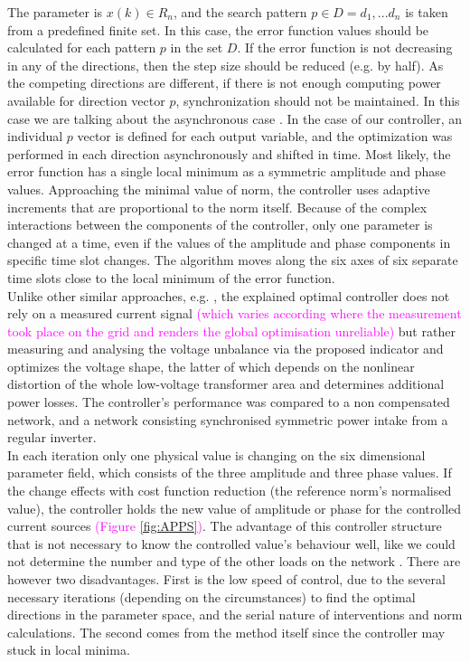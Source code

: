         The parameter is  $x(k)\in R_n$, and the search pattern $p\in D={d_1,...d_n}$ is taken from a predefined finite set. In this case, the error function values should be calculated for each pattern $p$ in the set $D$. If the error function is not decreasing in any of the directions, then the step size should be reduced (e.g. by half). As the competing directions are different, if there is not enough computing power available for direction vector $p$, synchronization should not be maintained. In this case we are talking about the asynchronous case . In the case of our controller, an individual $p$ vector is defined for each output variable, and the optimization was performed in each direction asynchronously and shifted in time. Most likely, the error function has a single local minimum as a symmetric amplitude and phase values. Approaching the minimal value of norm, the controller uses adaptive increments that are proportional to the norm itself. Because of the complex interactions between the components of the controller, only one parameter is changed at a time, even if the values of the amplitude and phase components in specific time slot changes. The algorithm moves along the six axes of six separate time slots close to the local minimum of the error function.\\
        Unlike other similar approaches, e.g. \cite{segui2007approach}, the explained optimal controller does not rely on a measured current signal \textcolor{magenta}{(which varies according where the measurement took place on the grid and renders the global optimisation unreliable)} but rather measuring and analysing the voltage unbalance via the proposed indicator and optimizes the voltage shape, the latter of which depends on the nonlinear distortion of the whole low-voltage transformer area and determines additional power losses. The controller's performance was compared to a non compensated network, and a network consisting synchronised symmetric power intake from a regular inverter.\\
        In each iteration only one physical value is changing on the six dimensional parameter field, which consists of the three amplitude and three phase values. If the change effects with cost function reduction (the reference norm's normalised value), the controller holds the new value of amplitude or phase for the controlled current sources \textcolor{magenta}{(Figure \ref{fig:APPS})}. The advantage of this controller structure that is not necessary to know the controlled value's behaviour well, like we could not determine the number and type of the other loads on the network \cite{Neukirchner2015}. There are however two disadvantages. First is the low speed of control, due to the several necessary iterations (depending on the circumstances) to find the optimal directions in the parameter space, and the serial nature of interventions and norm calculations. The second comes from the method itself since the controller may stuck in local minima.

